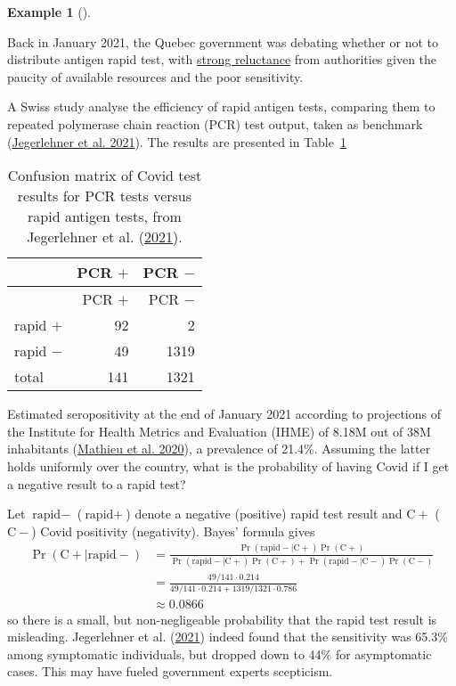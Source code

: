 \documentclass[
  11pt,
  letterpaper,
]{scrbook}
\theoremstyle{definition}
\newtheorem{example}{Example}[chapter]
\theoremstyle{remark}
\begin{document}
\begin{example}[]\protect\hypertarget{exm-covidrapidtest}{}\label{exm-covidrapidtest}

Back in January 2021, the Quebec government was debating whether or not
to distribute antigen rapid test, with
\href{https://www.cbc.ca/news/canada/montreal/quebec-avoids-relying-on-rapid-covid-19-tests-as-pressure-mounts-to-follow-ontario-s-lead-1.5896738}{strong
reluctance} from authorities given the paucity of available resources
and the poor sensitivity.

A Swiss study analyse the efficiency of rapid antigen tests, comparing
them to repeated polymerase chain reaction (PCR) test output, taken as
benchmark (\protect\hyperlink{ref-Jegerlehner:2021}{Jegerlehner et al.
2021}). The results are presented in Table~\ref{tbl-covid19}

\hypertarget{tbl-covid19}{}
\begin{longtable}[]{@{}lrr@{}}
\caption{\label{tbl-covid19}Confusion matrix of Covid test results for
PCR tests versus rapid antigen tests, from Jegerlehner et al.
(\protect\hyperlink{ref-Jegerlehner:2021}{2021}).}\tabularnewline
\toprule\noalign{}
& PCR \(+\) & PCR \(-\) \\
\midrule\noalign{}
\endfirsthead
\toprule\noalign{}
& PCR \(+\) & PCR \(-\) \\
\midrule\noalign{}
\endhead
\bottomrule\noalign{}
\endlastfoot
rapid \(+\) & 92 & 2 \\
rapid \(-\) & 49 & 1319 \\
total & 141 & 1321 \\
\end{longtable}

Estimated seropositivity at the end of January 2021 according to
projections of the Institute for Health Metrics and Evaluation (IHME) of
8.18M out of 38M inhabitants
(\protect\hyperlink{ref-owidcoronavirus}{Mathieu et al. 2020}), a
prevalence of 21.4\%. Assuming the latter holds uniformly over the
country, what is the probability of having Covid if I get a negative
result to a rapid test?

Let \(\text{rapid} -\) (\(\text{rapid} +\)) denote a negative (positive)
rapid test result and \(\mathrm{C}+\) (\(\mathrm{C}-\)) Covid positivity
(negativity). Bayes' formula gives \begin{align*}
\Pr(\text{C}+ \mid \text{rapid} -) & = \frac{\Pr(\text{rapid} - \mid \text{C}+)\Pr(\text{C}+)}{\Pr(\text{rapid} - \mid \text{C}+)\Pr(\text{C}+) + \Pr(\text{rapid} - \mid \text{C}-)\Pr(\text{C}-)} \\&=
\frac{49/141 \cdot 0.214}{49/141 \cdot 0.214 + 1319/1321 \cdot 0.786} \\&\approx 0.0866
\end{align*} so there is a small, but non-negligeable probability that
the rapid test result is misleading. Jegerlehner et al.
(\protect\hyperlink{ref-Jegerlehner:2021}{2021}) indeed found that the
sensitivity was 65.3\% among symptomatic individuals, but dropped down
to 44\% for asymptomatic cases. This may have fueled government experts
scepticism.

\end{example}
\end{document}
